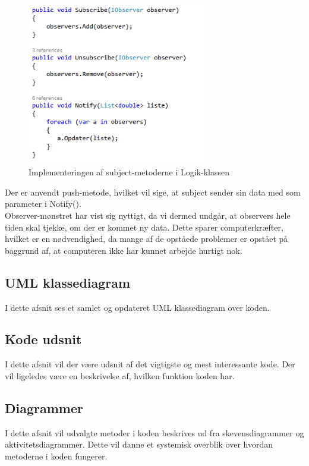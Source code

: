 \begin{figure}[H]
	\centering
	\includegraphics[width=0.7\textwidth]{Figurer/SoftwareImplementering/observer3}
	\caption{Implementeringen af subject-metoderne i Logik-klassen}
	\label{observer3}
\end{figure}
Der er anvendt push-metode, hvilket vil sige, at subject sender sin data med som parameter i Notify().\\
Observer-mønstret har vist sig nyttigt, da vi dermed undgår, at observers hele tiden skal tjekke, om der er kommet ny data. Dette sparer computerkræfter, hvilket er en nødvendighed, da mange af de opståede problemer er opstået på baggrund af, at computeren ikke har kunnet arbejde hurtigt nok.

\subsection{UML klassediagram}\label{UML klassediagram}
I dette afsnit ses et samlet og opdateret UML klassediagram over koden. 

\subsection{Kode udsnit}
I dette afsnit vil der være udsnit af det vigtigste og mest interessante kode. Der vil ligeledes være en beskrivelse af, hvilken funktion koden har.

\subsection{Diagrammer}
I dette afsnit vil udvalgte metoder i koden beskrives ud fra skevensdiagrammer og aktivitetsdiagrammer. Dette vil danne et systemisk overblik over hvordan metoderne i koden fungerer. 

 







